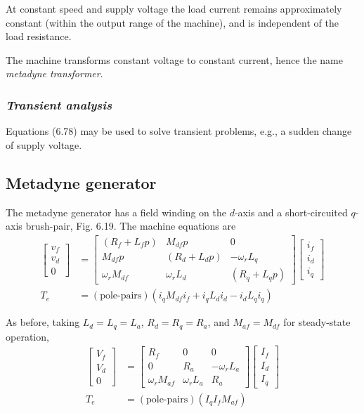 \documentclass[a4paper,numbers=noenddot,12pt]{scrbook}
\begin{document}
At constant speed and supply voltage the load current remains approximately constant (within the output range of the machine), and is independent of the load resistance.

The machine transforms constant voltage to constant current, hence the name \textit{metadyne transformer}.

\subsubsection{\textit{Transient analysis}} Equations (6.78) may be used to solve transient problems, e.g., a sudden change of supply voltage.

\subsection{Metadyne generator} The metadyne generator has a field winding on the $d$-axis and a short-circuited $q$-axis brush-pair, Fig. 6.19. The machine equations are
\begin{align}
    \begin{bmatrix}
        v_f \\ v_d \\ 0
    \end{bmatrix}
    & =
    \begin{bmatrix}
        (R_f + L_f p) & M_{df} p & 0 \\
        M_{df} p & (R_d + L_d p) & -\omega_r L_q \\
        \omega_r M_{df} & \omega_r L_d & (R_q + L_q p) 
    \end{bmatrix}
    \begin{bmatrix}
        i_f \\ i_d \\ i_q
    \end{bmatrix} \\
    T_e & = (\text{pole-pairs})(i_q M_{df} i_f + i_q L_d i_d - i_d L_q i_q)
    \label{eq:Eq6.84}
\end{align}

As before, taking $L_d = L_q = L_a$, $R_d = R_q = R_a$, and $M_{af} = M_{df}$ for steady-state operation,
\begin{align}
    \begin{bmatrix}
        V_f \\ V_d \\ 0
    \end{bmatrix}
    & =
    \begin{bmatrix}
        R_f & 0 & 0 \\
        0 & R_a & -\omega_r L_a \\
        \omega_r M_{af} & \omega_r L_a & R_a 
    \end{bmatrix}
    \begin{bmatrix}
        I_f \\ I_d \\ I_q
    \end{bmatrix} \\
    T_e & = (\text{pole-pairs})(I_q I_f M_{af})
    \label{eq:Eq6.86}
\end{align}
\end{document}
